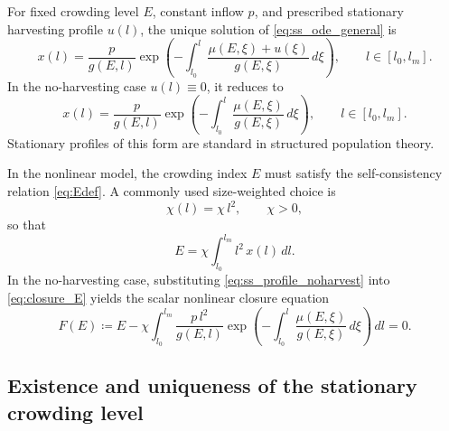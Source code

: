 \documentclass[pdflatex,sn-mathphys-num]{sn-jnl}
\theoremstyle{thmstyleone}
\theoremstyle{definition}
\theoremstyle{remark}
\begin{document}
For fixed crowding level $E$, constant inflow $p$, and prescribed stationary
harvesting profile $u(l)$, the unique solution of
\eqref{eq:ss_ode_general} is
\begin{equation}\label{eq:ss_profile}
x(l)=\frac{p}{g(E,l)}
\exp\!\left(
-\int_{l_0}^{l}\frac{\mu(E,\xi)+u(\xi)}{g(E,\xi)}\,d\xi
\right),
\qquad l\in[l_0,l_m].
\end{equation}
In the no-harvesting case
$u(l)\equiv 0$, it reduces to
\begin{equation}\label{eq:ss_profile_noharvest}
x(l)=\frac{p}{g(E,l)}
\exp\!\left(
-\int_{l_0}^{l}\frac{\mu(E,\xi)}{g(E,\xi)}\,d\xi
\right),
\qquad l\in[l_0,l_m].
\end{equation}
Stationary profiles of this form are standard in structured population theory.

In the nonlinear model, the crowding index $E$ must satisfy the
self-consistency relation \eqref{eq:Edef}. A commonly used size-weighted choice
is
\begin{equation}\label{eq:chi_l2}
\chi(l)=\chi\,l^2,\qquad \chi>0,
\end{equation}
so that
\begin{equation}\label{eq:closure_E}
E=\chi\int_{l_0}^{l_m} l^2\,x(l)\,dl.
\end{equation}
In the no-harvesting case, substituting \eqref{eq:ss_profile_noharvest} into
\eqref{eq:closure_E} yields the scalar nonlinear closure equation
\begin{equation}\label{eq:F_equation}
F(E)\coloneqq
E-\chi\int_{l_0}^{l_m}
\frac{p\,l^2}{g(E,l)}
\exp\!\left(
-\int_{l_0}^{l}\frac{\mu(E,\xi)}{g(E,\xi)}\,d\xi
\right)\,dl
=0.
\end{equation}

\subsection{Existence and uniqueness of the stationary crowding level}
\label{subsec:exist_unique}
\end{document}
